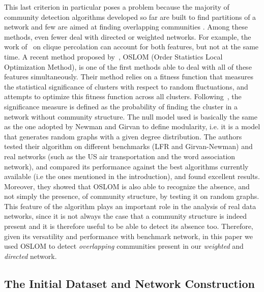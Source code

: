 This last criterion in particular poses a problem because the majority of community detection algorithms developed so far are built to find partitions of a network and few are aimed at finding overlapping communities \cite{BaumesGKMP05,PalEtAl05,ZhaWanZha07,Gre07,PhysRevE.77.016107,Lancichinetti2009,PhysRevE.80.016105,Kovacs2010}. Among these methods, even fewer deal with directed or weighted networks. For example, the work of~\cite{PalEtAl05} on clique percolation can account for both features, but not at the same time. A recent method proposed by~\cite{LancichinettiPlos}, OSLOM (Order Statistics Local Optimization Method), is one of the first methods  able to deal with all of these features simultaneously. Their method relies on a fitness function that measures the statistical significance of clusters with respect to random fluctuations, and attempts to optimize this fitness function across all clusters. 
Following~\cite{LancichinettiPlos}, the significance measure is defined as the probability of finding the cluster in a network without community structure. The null model used is basically the same as the one adopted by Newman and Girvan to define modularity, i.e. it is a model that generates random graphs with a given degree distribution. The authors tested their algorithm on different benchmarks (LFR and Girvan-Newman) and real networks (such as the US air transportation and the word association network), and compared its performance against the best algorithms
currently available (i.e the ones mentioned in the introduction), and found excellent results. Moreover, they showed that OSLOM is also able to recognize the absence, and not simply the presence, of community structure, by testing it on random graphs. This feature of the algorithm plays an important role in the analysis of real data networks, since it is not always the case that a community structure is indeed present and it is therefore useful to be able to detect its absence too. 
Therefore, given its versatility and performance with benchmark network, in this paper we used OSLOM to detect \emph{overlapping} communities present in our \emph{weighted} and \emph{directed} network.

\subsection{The Initial Dataset and Network Construction}

